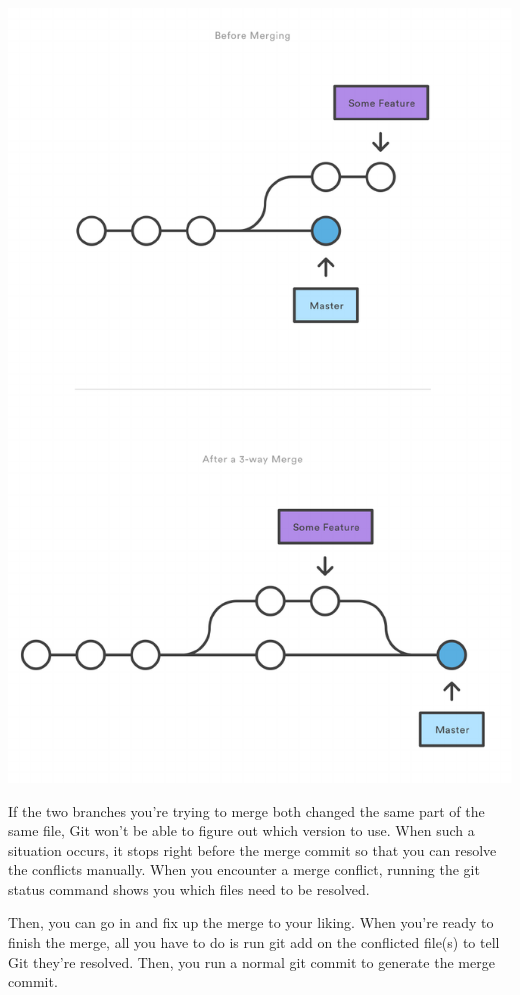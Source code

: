 \documentclass{article}
\begin{document}
\begin{center}
\includegraphics[scale=0.5]{figures/11.pdf}
\end{center}



If the two branches you're trying to merge both changed the same part
of the same file, Git won't be able to figure out which version to
use. When such a situation occurs, it stops right before the merge
commit so that you can resolve the conflicts manually. 
When you encounter a merge conflict, running the git status command
shows you which files need to be resolved. 

Then, you can go in and fix up the merge to your liking. When you're
ready to finish the merge, all you have to do is run git add on the
conflicted file(s) to tell Git they're resolved. Then, you run a
normal git commit to generate the merge commit. 
\end{document}
